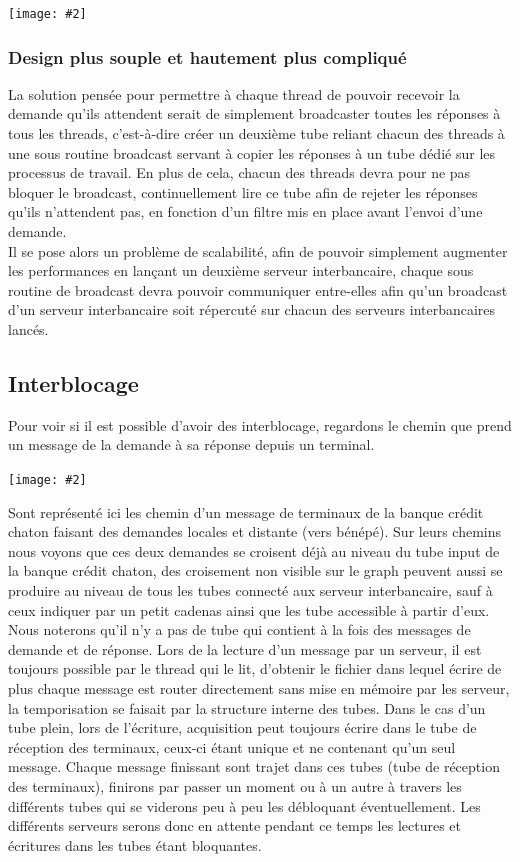 \documentclass[french, a4paper, 12pt, titlepage]{article}
\newcommand{\graph}[2]{
\medskip
	\begin{center}
		\texttt{[image: \#2]}
	\end{center}
\medskip
}
\begin{document}
\graph{0.4}{piscine}


\subsubsection{Design plus souple et hautement plus compliqué}
La solution pensée pour permettre à chaque thread de pouvoir recevoir la demande qu'ils attendent serait de simplement broadcaster toutes les réponses à tous les threads, c'est-à-dire créer un deuxième tube reliant chacun des threads à une sous routine \og broadcast\fg{} servant à copier les réponses à un tube dédié sur les processus de travail.
En plus de cela, chacun des threads devra pour ne pas bloquer le broadcast, continuellement lire ce tube afin de rejeter les réponses qu'ils n'attendent pas, en fonction d'un filtre mis en place avant l'envoi d'une demande.\\
\noindent
Il se pose alors un problème de scalabilité, afin de pouvoir simplement augmenter les performances en lançant un deuxième serveur interbancaire, chaque sous routine de broadcast devra pouvoir communiquer entre-elles afin qu'un broadcast d'un serveur interbancaire soit répercuté sur chacun des serveurs interbancaires lancés.

\subsection{Interblocage}
Pour voir si il est possible d'avoir des interblocage, regardons le chemin que prend un message de la demande à sa réponse depuis un terminal.
\graph{0.4}{interblocage}

Sont représenté ici les chemin d'un message de terminaux de la banque crédit chaton faisant des demandes locales et distante (vers bénépé).
Sur leurs chemins nous voyons que ces deux demandes se croisent déjà au niveau du tube \og input\fg{} de la banque crédit chaton, des croisement non visible sur le graph peuvent aussi se produire au niveau de tous les tubes connecté aux serveur interbancaire, sauf à ceux indiquer par un petit cadenas ainsi que les tube accessible à partir d'eux.
Nous noterons qu'il n'y a pas de tube qui contient à la fois des messages de demande et de réponse.
Lors de la lecture d'un message par un serveur, il est toujours possible par le thread qui le lit, d'obtenir le fichier dans lequel écrire de plus chaque message est router directement sans mise en mémoire par les serveur, la temporisation se faisait par la structure interne des tubes.
Dans le cas d'un tube plein, lors de l'écriture, acquisition peut toujours écrire dans le tube de réception des terminaux, ceux-ci étant unique et ne contenant qu'un seul message.
Chaque message finissant sont trajet dans ces tubes (tube de réception des terminaux), finirons par passer un moment ou à un autre à travers les différents tubes qui se viderons peu à peu les débloquant éventuellement.
Les différents serveurs serons donc en attente pendant ce temps les lectures et écritures dans les tubes étant bloquantes.
\end{document}
